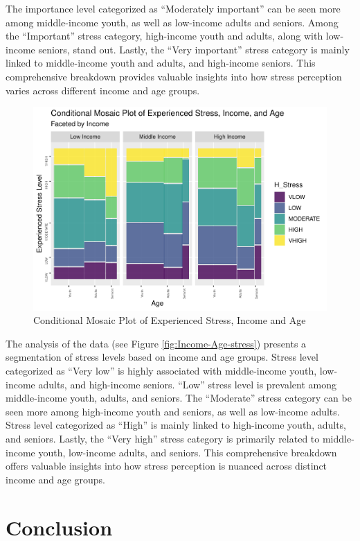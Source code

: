 \documentclass[
11pt, %
oneside, %
english, %
singlespacing, %
]{macthesis} %
\begin{document}
The importance level categorized as ``Moderately important'' can be seen more among middle-income youth, as well as low-income adults and seniors. Among the ``Important'' stress category, high-income youth and adults, along with low-income seniors, stand out. Lastly, the ``Very important'' stress category is mainly linked to middle-income youth and adults, and high-income seniors. This comprehensive breakdown provides valuable insights into how stress perception varies across different income and age groups.
\begin{figure}
\includegraphics[width=0.85\linewidth]{thesis_files/figure-latex/unnamed-chunk-34-1} \caption{\label{fig:Income-Age-stress}Conditional Mosaic Plot of Experienced Stress, Income and Age}\label{fig:unnamed-chunk-34}
\end{figure}
The analysis of the data (see Figure \ref{fig:Income-Age-stress}) presents a segmentation of stress levels based on income and age groups. Stress level categorized as ``Very low'' is highly associated with middle-income youth, low-income adults, and high-income seniors. ``Low'' stress level is prevalent among middle-income youth, adults, and seniors. The ``Moderate'' stress category can be seen more among high-income youth and seniors, as well as low-income adults. Stress level categorized as ``High'' is mainly linked to high-income youth, adults, and seniors. Lastly, the ``Very high'' stress category is primarily related to middle-income youth, low-income adults, and seniors. This comprehensive breakdown offers valuable insights into how stress perception is nuanced across distinct income and age groups.

\hypertarget{conclusion}{%
\section{Conclusion}\label{conclusion}}
\end{document}
